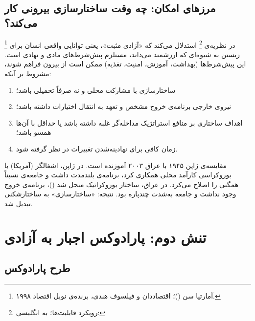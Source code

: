 \subsection{مرزهای امکان: چه وقت ساختارسازی بیرونی کار می‌کند؟}
\label{subsec:ch02-t1-conditions}

%
\footnote{%
	آمارتیا سن ()؛%
	اقتصاددان و فیلسوف هندی، برنده‌ی نوبل اقتصاد ۱۹۹۸.%
}%
در نظریه‌ی %
\footnote{رویکرد قابلیت‌ها؛ به انگلیسی: }%
استدلال می‌کند که «آزادی مثبت»، یعنی توانایی واقعی انسان برای
زیستن به شیوه‌ای که ارزشمند می‌داند، مستلزم پیش‌شرط‌های مادی
و نهادی است. این پیش‌شرط‌ها
(بهداشت، آموزش، امنیت، تغذیه) ممکن است از بیرون فراهم شوند،
مشروط بر آنکه:

\begin{enumerate}[label=\textbf{\arabic*.}, nosep, rightmargin=1em]
	\item ساختارسازی با مشارکت محلی و نه صرفاً تحمیلی باشد؛
	\item نیروی خارجی برنامه‌ی خروج مشخص و تعهد به انتقال
	اختیارات داشته باشد؛
	\item اهداف ساختاری بر منافع استراتژیک مداخله‌گر غلبه
	داشته باشد یا حداقل با آن‌ها همسو باشد؛
	\item زمان کافی برای نهادینه‌شدن تغییرات در نظر گرفته شود.
\end{enumerate}

\begin{tcolorbox}[enemybox, title={نمونه‌ی ناموفق: عراق ۲۰۰۳}]
	مقایسه‌ی ژاپن ۱۹۴۵ با عراق ۲۰۰۳ آموزنده است. در ژاپن، اشغالگر
	(آمریکا) با بوروکراسی کارآمد محلی همکاری کرد، برنامه‌ی بلندمدت
	داشت و جامعه‌ی نسبتاً همگنی را اصلاح می‌کرد. در عراق، ساختار
	بوروکراتیک منحل شد ()، برنامه‌ی خروج
	وجود نداشت و جامعه به‌شدت چندپاره بود. نتیجه: «ساختارسازی»
	به ساختارشکنی تبدیل
	شد.
\end{tcolorbox}


\section{تنش دوم: پارادوکس اجبار به آزادی}
\label{sec:ch02-tension2}

\subsection{طرح پارادوکس}
\label{subsec:ch02-t2-paradox}

